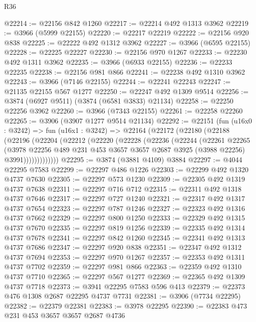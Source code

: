 \begin{lexlean}{R36}
\begin{coremodule}
@22214 := @22156 @842 @1260
@22217 := @22214 @492 @1313 @3962
@22219 := @3966 (@5999 @22155)
@22220 := @22217 @22219
@22222 := @22156 @920 @838
@22225 := @22222 @492 @1312 @3962
@22227 := @3966 (@6595 @22155)
@22228 := @22225 @22227
@22230 := @22156 @970 @1267
@22233 := @22230 @492 @1311 @3962
@22235 := @3966 (@6933 @22155)
@22236 := @22233 @22235
@22238 := @22156 @981 @866
@22241 := @22238 @492 @1310 @3962
@22243 := @3966 (@7146 @22155)
@22244 := @22241 @22243
@22247 := @21135 @22155 @567 @1277
@22250 := @22247 @492 @1309 @9514
@22256 := @3874 (@6927 @9511) (@3874 (@6581 @3833) @21134)
@22258 := @22250 @22256 @3962
@22260 := @3966 (@7343 @22155)
@22261 := @22258 @22260
@22265 := @3906 (@3907 @1277 @9514 @21134)
@22292 := @22151
    (fun (u16x0 : @3242) =>
    fun (u16x1 : @3242) =>
    @22164
      (@22172
        (@22180
          (@22188
            (@22196
              (@22204
                (@22212
                  (@22220
                    (@22228
                      (@22236
                        (@22244
                          (@22261
                            @22265
                            (@3978
                              @22256
                              @489
                              @231
                              @453
                              @3657
                              @3657
                              @2687
                              @3925
                              (@3988 @22256)
                              @3991)))))))))))))
@22295 := @3874 (@3881 @4109) @3884
@22297 := @4044 @22295 @7583
@22299 := @22297 @486 @1226
@22303 := @22299 @492 @1320 @4737 @7630
@22305 := @22297 @573 @1230
@22309 := @22305 @492 @1319 @4737 @7638
@22311 := @22297 @716 @712
@22315 := @22311 @492 @1318 @4737 @7646
@22317 := @22297 @727 @1240
@22321 := @22317 @492 @1317 @4737 @7654
@22323 := @22297 @787 @1246
@22327 := @22323 @492 @1316 @4737 @7662
@22329 := @22297 @800 @1250
@22333 := @22329 @492 @1315 @4737 @7670
@22335 := @22297 @819 @1256
@22339 := @22335 @492 @1314 @4737 @7678
@22341 := @22297 @842 @1260
@22345 := @22341 @492 @1313 @4737 @7686
@22347 := @22297 @920 @838
@22351 := @22347 @492 @1312 @4737 @7694
@22353 := @22297 @970 @1267
@22357 := @22353 @492 @1311 @4737 @7702
@22359 := @22297 @981 @866
@22363 := @22359 @492 @1310 @4737 @7710
@22365 := @22297 @567 @1277
@22369 := @22365 @492 @1309 @4737 @7718
@22373 := @3941 @22295 @7583 @596 @413
@22379 := @22373 @476 @1308 @2687 @22295 @4737 @7731
@22381 := @3906 (@7734 @22295)
@22382 := @22379 @22381
@22383 := @3978 @22295
@22390 := @22383 @473 @231 @453 @3657 @3657 @2687 @4736

\end{coremodule}
\end{lexlean}
